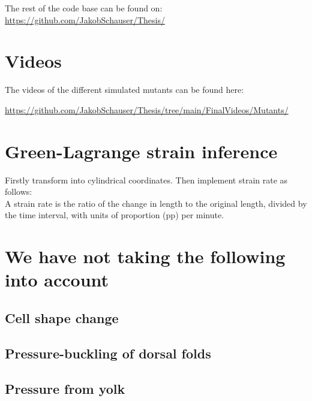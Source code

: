The rest of the code base can be found on:
\url{https://github.com/JakobSchauser/Thesis/}
\section{Videos}
\label{App:videos}
The videos of the different simulated mutants can be found here:

\url{https://github.com/JakobSchauser/Thesis/tree/main/FinalVideos/Mutants/}

\section{Green-Lagrange strain inference}
\label{App:Strain-Calculation}
Firstly transform into cylindrical coordinates. Then implement strain rate as follows:\\
A strain rate is the ratio of the change in length to the original length, divided by the time interval, with units of proportion (pp) per minute.

\section{We have not taking the following into account}
\subsection{Cell shape change}
\subsection{Pressure-buckling of dorsal folds}
\subsection{Pressure from yolk}
